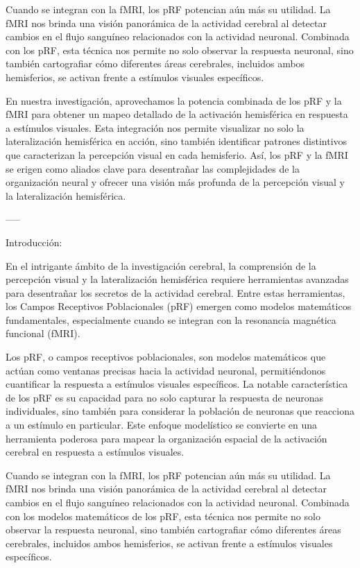 \documentclass[12pt,oneside]{uhthesis}
\begin{document}
Cuando se integran con la fMRI, los pRF potencian aún más su utilidad. La fMRI nos brinda una visión panorámica de la actividad cerebral al detectar cambios en el flujo sanguíneo relacionados con la actividad neuronal. Combinada con los pRF, esta técnica nos permite no solo observar la respuesta neuronal, sino también cartografiar cómo diferentes áreas cerebrales, incluidos ambos hemisferios, se activan frente a estímulos visuales específicos.

En nuestra investigación, aprovechamos la potencia combinada de los pRF y la fMRI para obtener un mapeo detallado de la activación hemisférica en respuesta a estímulos visuales. Esta integración nos permite visualizar no solo la lateralización hemisférica en acción, sino también identificar patrones distintivos que caracterizan la percepción visual en cada hemisferio. Así, los pRF y la fMRI se erigen como aliados clave para desentrañar las complejidades de la organización neural y ofrecer una visión más profunda de la percepción visual y la lateralización hemisférica.

-----

Introducción:

En el intrigante ámbito de la investigación cerebral, la comprensión de la percepción visual y la lateralización hemisférica requiere herramientas avanzadas para desentrañar los secretos de la actividad cerebral. Entre estas herramientas, los Campos Receptivos Poblacionales (pRF) emergen como modelos matemáticos fundamentales, especialmente cuando se integran con la resonancia magnética funcional (fMRI).

Los pRF, o campos receptivos poblacionales, son modelos matemáticos que actúan como ventanas precisas hacia la actividad neuronal, permitiéndonos cuantificar la respuesta a estímulos visuales específicos. La notable característica de los pRF es su capacidad para no solo capturar la respuesta de neuronas individuales, sino también para considerar la población de neuronas que reacciona a un estímulo en particular. Este enfoque modelístico se convierte en una herramienta poderosa para mapear la organización espacial de la activación cerebral en respuesta a estímulos visuales.

Cuando se integran con la fMRI, los pRF potencian aún más su utilidad. La fMRI nos brinda una visión panorámica de la actividad cerebral al detectar cambios en el flujo sanguíneo relacionados con la actividad neuronal. Combinada con los modelos matemáticos de los pRF, esta técnica nos permite no solo observar la respuesta neuronal, sino también cartografiar cómo diferentes áreas cerebrales, incluidos ambos hemisferios, se activan frente a estímulos visuales específicos.
\end{document}
